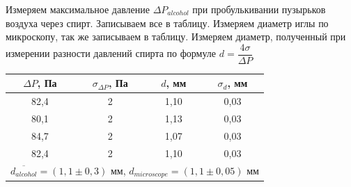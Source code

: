 \documentclass[a4paper, 12pt]{article}%
\begin{document}
Измеряем максимальное давление $\Delta P_{alcohol}$  при  пробулькивании пузырьков воздуха через спирт. Записываем все в таблицу. Измеряем диаметр иглы по микроскопу, так же записываем в таблицу. Измеряем диаметр, полученный при измерении разности давлений спирта по формуле $d = \dfrac{4 \sigma}{\Delta P}$

\begin{tabular}{|c|c|c|c|}
\hline
$\Delta P$, Па              & $\sigma_{\Delta P}$, Па              & $d$, мм              & $\sigma_{d}$, мм              \\ \hline
82,4                        & 2                                    & 1,10                 & 0,03                          \\ \hline
80,1                        & 2                                    & 1,13                 & 0,03                          \\ \hline
84,7                        & 2                                    & 1,07                 & 0,03                          \\ \hline
82,4                        & 2                                    & 1,10                 & 0,03                          \\ \hline
\multicolumn{4}{|c|}{ $\overline{d_{alcohol}} = (1,1 \pm 0,3)$ мм, $d_{microscope} = (1,1 \pm 0,05)$ мм} \\ \hline
\end{tabular}
\end{document}
